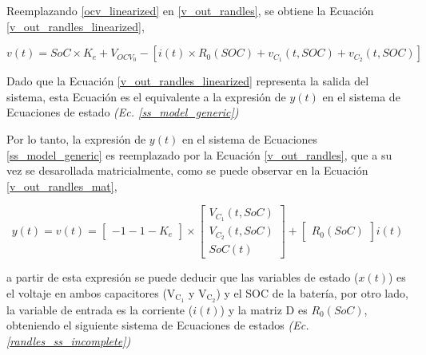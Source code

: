 \documentclass[10pt, a4paper]{article}
\begin{document}
Reemplazando \ref{ocv_linearized} en \ref{v_out_randles}, se obtiene la
Ecuaci\'on \ref{v_out_randles_linearized},

\begin{equation}
    v(t) = SoC \times K_e + V_{OCV_0} - \left[i(t) \times R_0\left(SOC\right) 
        + v_{C_1}\left(t, SOC\right) + v_{C_2}\left(t, SOC\right)\right] 
    \label{v_out_randles_linearized}
\end{equation}

Dado que la Ecuaci\'on \ref{v_out_randles_linearized} representa la salida del 
sistema, esta Ecuaci\'on es el equivalente a la expresi\'on de $y(t)$ en el 
sistema de Ecuaciones de estado \emph{(Ec. \ref{ss_model_generic})}

Por lo tanto, la expresi\'on de $y(t)$ en el sistema de Ecuaciones
\ref{ss_model_generic} es reemplazado por la Ecuaci\'on \ref{v_out_randles}, que
a su vez se desarollada matricialmente, como se puede observar en la
Ecuaci\'on \ref{v_out_randles_mat},

\begin{equation}
    y(t) = v(t) = \begin{bmatrix} -1 -1 -K_e \end{bmatrix} \times 
    \begin{bmatrix} V_{C_1}(t, SoC) \\ V_{C_2}(t, SoC) \\ SoC(t) \end{bmatrix} +
    \begin{bmatrix} R_0(SoC) \end{bmatrix} i(t)\label{v_out_randles_mat}
\end{equation}

a partir de esta expresi\'on se puede deducir que las variables de estado 
($x(t)$) es el voltaje en ambos capacitores ($\mathrm{V_{C_1}}$ y 
$\mathrm{V_{C_2}}$) y el \acrshort{SOC} de la bater\'ia, por otro lado, la 
variable de entrada es la corriente ($i(t)$) y la matriz D es $R_0(SoC)$, 
obteniendo el siguiente sistema de Ecuaciones de estados 
\emph{(Ec. \ref{randles_ss_incomplete})}
\end{document}
